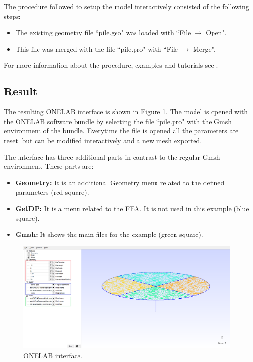 \documentclass[a4]{article}
\begin{document}
The procedure followed to setup the model interactively consisted of the following steps:

\begin{itemize}

	\item The existing geometry file ``pile.geo" was loaded with ``File $\rightarrow$ Open".
	
	\item This file was merged with the file ``pile.pro" with ``File $\rightarrow$ Merge".
    
\end{itemize}

For more information about the procedure, examples and tutorials see \cite{onelabweb}. 

\subsection{Result}

The resulting ONELAB interface is shown in Figure \ref{fig:onelab_example}. The model is opened with the ONELAB software bundle by selecting the file ``pile.pro" with the Gmsh environment of the bundle. Everytime the file is opened all the parameters are reset, but can be modified interactively and a new mesh exported.

The interface has three additional parts in contrast to the regular Gmsh environment. These parts are:

\begin{itemize}
	\item \textbf{Geometry:} It is an additional Geometry menu related to the defined parameters (red square).
	
	\item \textbf{GetDP:} It is a menu related to the FEA. It is not used in this example (blue square).
	
	\item \textbf{Gmsh:} It shows the main files for the example (green square).
\end{itemize} 

\begin{figure}[tbh!]
	\centering
	\includegraphics[scale=0.45]{onelab_example_coloured.png}
	\caption{ONELAB interface.}
	\label{fig:onelab_example}
\end{figure}
\end{document}
